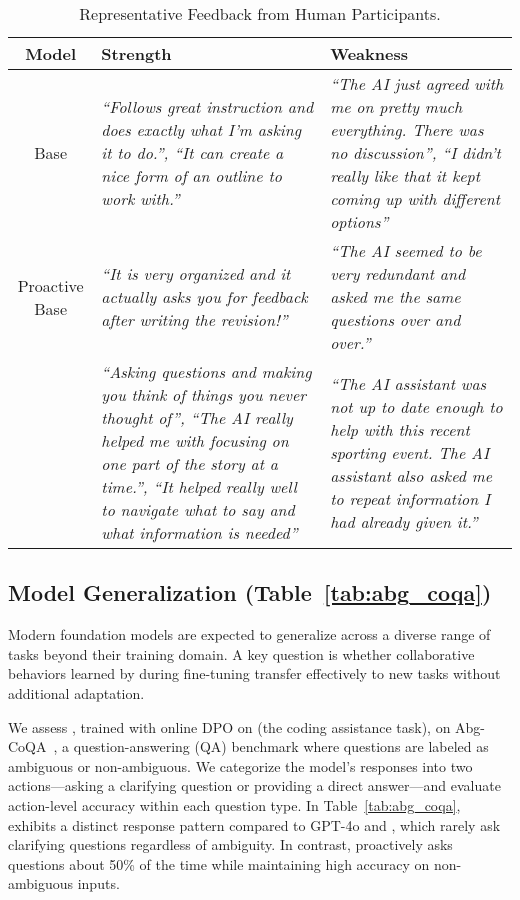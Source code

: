 \begin{table*}[t]
\centering
\begin{tabularx}{\textwidth}{|c|X|X|}
    \hline
    \footnotesize \textbf{Model} & \footnotesize \textbf{Strength} & \footnotesize \textbf{Weakness} \\
    \hline
    Base & \textit{``Follows great instruction and does exactly what I'm asking it to do.'', ``It can create a nice form of an outline to work with.''} & \textit{``The AI just agreed with me on pretty much everything. There was no discussion'', ``I didn't really like that it kept coming up with different options''} \\
    \hline
    Proactive Base & \textit{``It is very organized and it actually asks you for feedback after writing the revision!''} & \textit{``The AI seemed to be very redundant and asked me the same questions over and over.''} \\
    \hline
    \name{} & \textit{``Asking questions and making you think of things you never thought of'', ``The AI really helped me with focusing on one part of the story at a time.'', ``It helped really well to navigate what to say and what information is needed''} & \textit{``The AI assistant was not up to date enough to help with this recent sporting event.  The AI assistant also asked me to repeat information I had already given it.''} \\
    \hline
\end{tabularx}
\vspace{-10pt}
\caption{Representative Feedback from Human Participants.}
\vspace{-10pt}
\label{tab:user_study}
\end{table*}

\subsection{Model Generalization (Table~\ref{tab:abg_coqa})}
\label{sec:generalization}
Modern foundation models are expected to generalize across a diverse range of tasks beyond their training domain. A key question is whether collaborative behaviors learned by \name{} during fine-tuning transfer effectively to new tasks without additional adaptation. 

We assess \name{}, trained with online DPO on \code (the coding assistance task), on Abg-CoQA~\cite{abg_coqa}, a question-answering (QA) benchmark where questions are labeled as ambiguous or non-ambiguous.
We categorize the model’s responses into two actions—asking a clarifying question or providing a direct answer—and evaluate action-level accuracy within each question type. 
In Table~\ref{tab:abg_coqa}, \name{} exhibits a distinct response pattern compared to GPT-4o and \llama{}, which rarely ask clarifying questions regardless of ambiguity. In contrast, \name{} proactively asks questions about 50\% of the time while maintaining high accuracy on non-ambiguous inputs.


